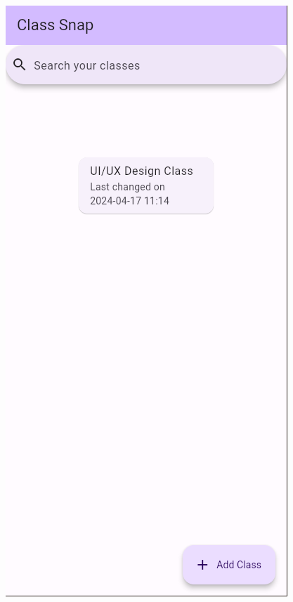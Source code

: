 \documentclass{beamer}
\begin{document}
\begin{frame}
\begin{figure}
			\begin{minipage}{0.16\textwidth}
				\includegraphics[width=\linewidth]{fix_bug_naming}
			\end{minipage}
		\end{figure}
	\end{frame}
	
\end{document}
